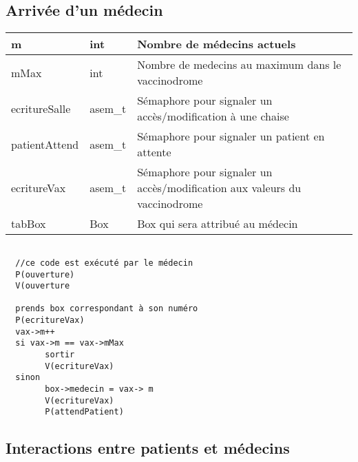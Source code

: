 \documentclass[a4paper]{article}
\makeatletter
\newenvironment{expl}{%
  \begin{list}{}{%
      \small\itshape%
      \topsep\z@%
      \listparindent0pt%
      \parsep0.75\baselineskip%
      \setlength{\leftmargin}{20mm}%
      \setlength{\rightmargin}{20mm}%
    }
  \item[]}%
  {\end{list}}
\makeatother
\begin{document}
\subsection{Arrivée d'un médecin}
\begin{tabularx}{\linewidth}{|l|l|>{\strut}X|}
      \hline%
        m & int & Nombre de médecins actuels \\ \hline%
        mMax & int & Nombre de medecins au maximum dans le vaccinodrome \\ \hline%
        ecritureSalle & asem\_t & Sémaphore pour signaler un accès/modification à une chaise \\ \hline%
        patientAttend & asem\_t & Sémaphore pour signaler un patient en attente \\ \hline%
        ecritureVax & asem\_t & Sémaphore pour signaler un accès/modification aux valeurs du vaccinodrome \\ \hline%
        tabBox & Box & Box qui sera attribué au médecin \\ \hline%
        
    \end{tabularx}
\begin{expl}

  \begin{verbatim}
  
  //ce code est exécuté par le médecin
  P(ouverture)
  V(ouverture
  
  prends box correspondant à son numéro
  P(ecritureVax)
  vax->m++
  si vax->m == vax->mMax 
        sortir 
        V(ecritureVax)
  sinon 
        box->medecin = vax-> m 
        V(ecritureVax)
        P(attendPatient)
    \end{verbatim}
    
    
\end{expl}

\subsection{Interactions entre patients et médecins}
\end{document}
